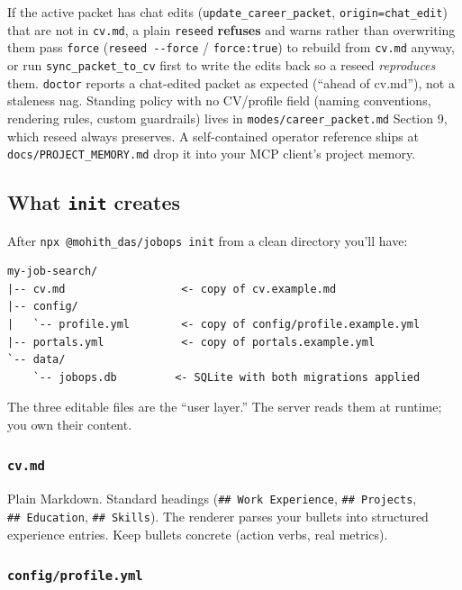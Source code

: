 \documentclass[11pt,letterpaper]{article}
\newcommand{\tool}[1]{\texttt{#1}}
\newcommand{\fpath}[1]{\texttt{#1}}
\newcommand{\cmd}[1]{\texttt{#1}}
\begin{document}
\begin{warnbox}
If the active packet has chat edits (\tool{update\_career\_packet}, \texttt{origin=chat\_edit})
that are not in \fpath{cv.md}, a plain \cmd{reseed} \textbf{refuses} and warns rather than
overwriting them \textemdash{} pass \texttt{force} (\cmd{reseed -{}-force} / \texttt{force:true})
to rebuild from \fpath{cv.md} anyway, or run \tool{sync\_packet\_to\_cv} first to write the edits
back so a reseed \emph{reproduces} them. \cmd{doctor} reports a chat-edited packet as expected
(``ahead of cv.md''), not a staleness nag. Standing policy with no CV/profile field (naming
conventions, rendering rules, custom guardrails) lives in \fpath{modes/career\_packet.md}
Section 9, which reseed always preserves. A self-contained operator reference ships at
\fpath{docs/PROJECT\_MEMORY.md} \textemdash{} drop it into your MCP client's project memory.
\end{warnbox}

\subsection*{What \tool{init} creates}

After \cmd{npx @mohith\_das/jobops init} from a clean directory you'll have:

\begin{lstlisting}
my-job-search/
|-- cv.md                  <- copy of cv.example.md
|-- config/
|   `-- profile.yml        <- copy of config/profile.example.yml
|-- portals.yml            <- copy of portals.example.yml
`-- data/
    `-- jobops.db         <- SQLite with both migrations applied
\end{lstlisting}

The three editable files are the ``user layer.'' The server reads them at runtime; you own their content.

\subsubsection*{\fpath{cv.md}}

Plain Markdown. Standard headings (\texttt{\#\#\ Work Experience}, \texttt{\#\#\ Projects}, \texttt{\#\#\ Education}, \texttt{\#\#\ Skills}). The renderer parses your bullets into structured experience entries. Keep bullets concrete (action verbs, real metrics).

\subsubsection*{\fpath{config/profile.yml}}
\end{document}
